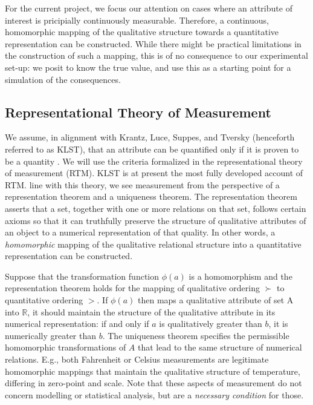 \documentclass[utf8]{FrontiersinVancouver}
\begin{document}
For the current project, we focus our attention on cases where an attribute of interest is pricipially continuously measurable. Therefore, a continuous, homomorphic mapping of the qualitative structure towards a quantitative representation can be constructed. While there might be practical limitations in the construction of such a mapping, this is of no consequence to our experimental set-up: we posit to know the true value, and use this as a starting point for a simulation of the consequences.

\subsection{Representational Theory of Measurement}
We assume, in alignment with Krantz, Luce, Suppes, and Tversky (henceforth referred to as KLST), that an attribute can be quantified only if it is proven to be a quantity \citep{}. We will use the criteria formalized in the representational theory of measurement (RTM). KLST is at present the most fully developed account of RTM. \@In line with this theory, we see measurement from the perspective of a representation theorem and a uniqueness theorem. The representation theorem asserts that a set, together with one or more relations on that set, follows certain axioms so that it can truthfully preserve the structure of qualitative attributes of an object to a numerical representation of that quality. In other words, a \textit{homomorphic} mapping of the qualitative relational structure into a quantitative representation can be constructed. 

Suppose that the transformation function $\phi(a)$ is a homomorphism and the representation theorem holds for the mapping of qualitative ordering $\succ$ to quantitative ordering $>$. If $\phi(a)$ then maps a qualitative attribute of set A into $\mathbb{R}$, it should maintain the structure of the qualitative attribute in its numerical representation: if and only if $a$ is qualitatively greater than $b$, it is numerically greater than $b$. The uniqueness theorem specifies the permissible homomorphic transformations of $A$ that lead to the same structure of numerical relations. E.g., both Fahrenheit or Celsius measurements are legitimate homomorphic mappings that maintain the qualitative structure of temperature, differing in zero-point and scale. Note that these aspects of measurement do not concern modelling or statistical analysis, but are a \textit{necessary condition} for those.
\end{document}
